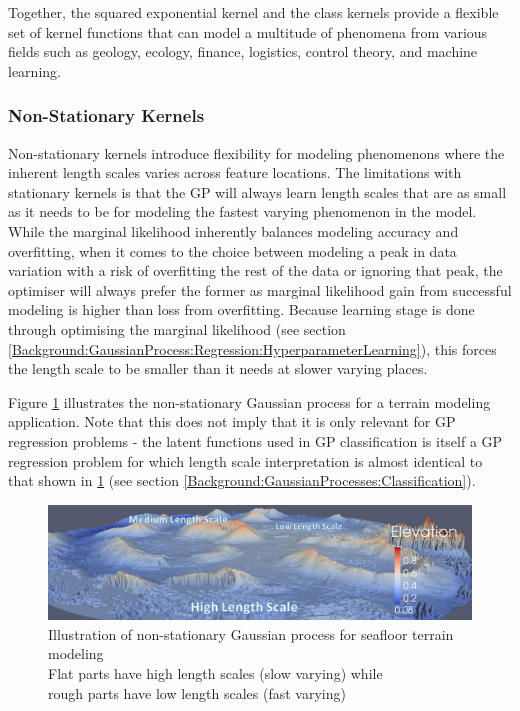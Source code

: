 				Together, the squared exponential kernel and the \matern class kernels provide a flexible set of kernel functions that can model a multitude of phenomena from various fields such as geology, ecology, finance, logistics, control theory, and machine learning.
			
			\subsubsection{Non-Stationary Kernels}
			\label{Background:GaussianProcesses:KernelFunctions:Nonstationary}
			
				Non-stationary kernels introduce flexibility for modeling phenomenons where the inherent length scales varies across feature locations. The limitations with stationary kernels is that the GP will always learn length scales that are as small as it needs to be for modeling the fastest varying phenomenon in the model. While the marginal likelihood inherently balances modeling accuracy and overfitting, when it comes to the choice between modeling a peak in data variation with a risk of overfitting the rest of the data or ignoring that peak, the optimiser will always prefer the former as marginal likelihood gain from successful modeling is higher than loss from overfitting. Because learning stage is done through optimising the marginal likelihood (see section \ref{Background:GaussianProcess:Regression:HyperparameterLearning}), this forces the length scale to be smaller than it needs at slower varying places.

				Figure \ref{Figure:GaussianProcessLengthScale} illustrates the non-stationary Gaussian process for a terrain modeling application. Note that this does not imply that it is only relevant for GP regression problems - the latent functions used in GP classification is itself a GP regression problem for which length scale interpretation is almost identical to that shown in \cref{Figure:GaussianProcessLengthScale} (see section \ref{Background:GaussianProcesses:Classification}).
				
				\begin{figure}[!htbp]
					\centering
						\includegraphics[width=\textwidth]{Figures/gaussianprocesslengthscale.png}
					\caption{Illustration of non-stationary Gaussian process for seafloor terrain modeling \citep{GaussianProcessTerrainFigure} \\
					Flat parts have high length scales (slow varying) while \\ rough parts have low length scales (fast varying)}
					\label{Figure:GaussianProcessLengthScale}
				\end{figure}
				
